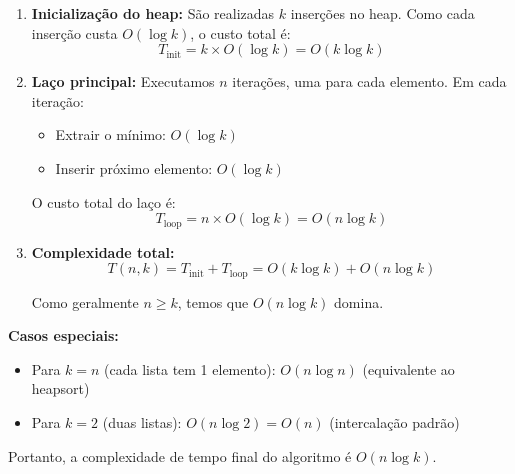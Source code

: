 \documentclass[a4paper,12pt]{article}
\begin{document}
\begin{enumerate}
    \item \textbf{Inicialização do heap:} São realizadas $k$ inserções no heap. Como cada inserção custa $O(\log k)$, o custo total é:
    \begin{equation}
    T_{\text{init}} = k \times O(\log k) = O(k \log k)
    \end{equation}
    
    \item \textbf{Laço principal:} Executamos $n$ iterações, uma para cada elemento. Em cada iteração:
    \begin{itemize}
        \item Extrair o mínimo: $O(\log k)$
        \item Inserir próximo elemento: $O(\log k)$
    \end{itemize}
    O custo total do laço é:
    \begin{equation}
    T_{\text{loop}} = n \times O(\log k) = O(n \log k)
    \end{equation}
    
    \item \textbf{Complexidade total:}
    \begin{equation}
    T(n,k) = T_{\text{init}} + T_{\text{loop}} = O(k \log k) + O(n \log k)
    \end{equation}
    
    Como geralmente $n \geq k$, temos que $O(n \log k)$ domina.
\end{enumerate}

\textbf{Casos especiais:}
\begin{itemize}
    \item Para $k = n$ (cada lista tem 1 elemento): $O(n \log n)$ (equivalente ao heapsort)
    \item Para $k = 2$ (duas listas): $O(n \log 2) = O(n)$ (intercalação padrão)
\end{itemize}

Portanto, a complexidade de tempo final do algoritmo é $\boxed{O(n \log k)}$.
\end{document}
